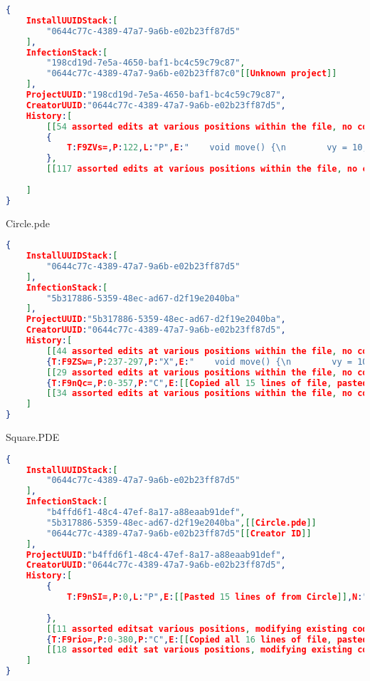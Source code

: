 \documentclass[12pt,final,thesis,actual]{uhthesis}
\newcommand{\n}{\hfill\break}
\begin{document}
\begin{lstlisting}[language=json]
{
	InstallUUIDStack:[
		"0644c77c-4389-47a7-9a6b-e02b23ff87d5"
	],
	InfectionStack:[
		"198cd19d-7e5a-4650-baf1-bc4c59c79c87",
		"0644c77c-4389-47a7-9a6b-e02b23ff87c0"[[Unknown project]]
	],
	ProjectUUID:"198cd19d-7e5a-4650-baf1-bc4c59c79c87",
	CreatorUUID:"0644c77c-4389-47a7-9a6b-e02b23ff87d5",
	History:[
		[[54 assorted edits at various positions within the file, no copies or pastes]]
		{
			T:F9ZVs=,P:122,L:"P",E:"    void move() {\n        vy = 10;\n        y = y + vy;\n    }",N:"Paste too short to track"[[Came from a Cut in Circle]]
		},
		[[117 assorted edits at various positions within the file, no copies or pastes]]
		
	]
}
\end{lstlisting}
\pagebreak
Circle.pde
\begin{lstlisting}[language=json]
{
	InstallUUIDStack:[
		"0644c77c-4389-47a7-9a6b-e02b23ff87d5"
	],
	InfectionStack:[
		"5b317886-5359-48ec-ad67-d2f19e2040ba"
	],
	ProjectUUID:"5b317886-5359-48ec-ad67-d2f19e2040ba",
	CreatorUUID:"0644c77c-4389-47a7-9a6b-e02b23ff87d5",
	History:[
		[[44 assorted edits at various positions within the file, no copies or pastes]]
		{T:F9ZSw=,P:237-297,P:"X",E:"    void move() {\n        vy = 10;\n        y = y + vy;\n    }"[[Cut code goes to Shape]]},
		[[29 assorted edits at various positions within the file, no copies or pastes]]
		{T:F9nQc=,P:0-357,P:"C",E:[[Copied all 15 lines of file, pasted into Square]]},
		[[34 assorted edits at various positions within the file, no copies or pastes]]
	]
}
\end{lstlisting}
\pagebreak
Square.PDE
\begin{lstlisting}[language=json]
{
	InstallUUIDStack:[
		"0644c77c-4389-47a7-9a6b-e02b23ff87d5"
	],
	InfectionStack:[
		"b4ffd6f1-48c4-47ef-8a17-a88eaab91def",
		"5b317886-5359-48ec-ad67-d2f19e2040ba",[[Circle.pde]]
		"0644c77c-4389-47a7-9a6b-e02b23ff87d5"[[Creator ID]]
	],
	ProjectUUID:"b4ffd6f1-48c4-47ef-8a17-a88eaab91def",
	CreatorUUID:"0644c77c-4389-47a7-9a6b-e02b23ff87d5",
	History:[
		{
			T:F9nSI=,P:0,L:"P",E:[[Pasted 15 lines of from Circle]],N:"paste from project with same creator;Paste from project with UUID 5b317886-5359-48ec-ad67-d2f19e2040ba;"
		
		},
		[[11 assorted editsat various positions, modifying existing code, no copies or pastes]]	
		{T:F9rio=,P:0-380,P:"C",E:[[Copied all 16 lines of file, pasted into Triangle]]},
		[[18 assorted edit sat various positions, modifying existing code, no copies or pastes]]
	]
}
\end{lstlisting}
\end{document}
